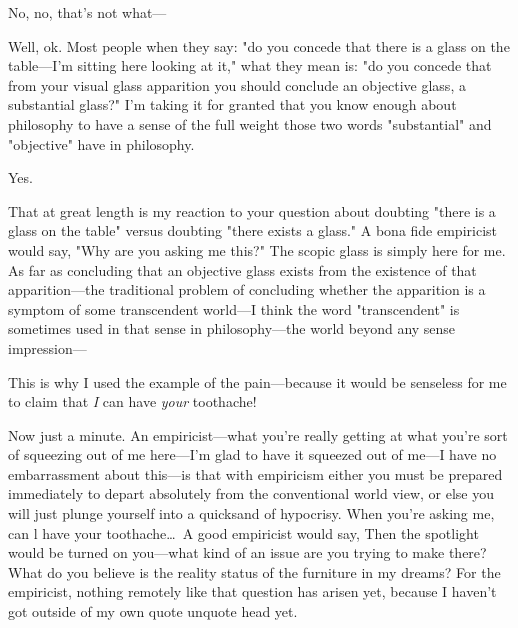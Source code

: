 No, no, that's not what---

 Well, ok. Most people when they say: 
"do you concede that there is a glass on the table---I'm sitting here looking at it," what they 
mean is: "do you concede that from your visual glass apparition you should conclude an objective glass, a substantial glass?" I'm taking it for 
granted that you know enough about philosophy to have a sense of the 
full weight those two words "substantial" and "objective" have in 
philosophy. 

 Yes. 

 That at great length is my reaction to your question about 
doubting "there is a glass on the table" versus doubting "there exists a glass." 
A bona fide empiricist would say, "Why are you asking me this?" 
The scopic glass is simply here for me. As far as concluding that an 
objective glass exists from the existence of that apparition---the traditional 
problem of concluding whether the apparition is a symptom of 
some transcendent world---I think the word "transcendent" is sometimes 
used in that sense in philosophy---the world beyond any sense 
impression--- 

 This is why I used the example of the pain---because it 
would be senseless for me to claim that \emph{I} can have \emph{your} toothache! 

 Now just a minute. An empiricist---what you're really getting 
at what you're sort of squeezing out of me here---I'm glad to have it 
squeezed out of me---I have no embarrassment about this---is that with 
empiricism either you must be prepared immediately to depart 
absolutely from the conventional world view, or else you will just plunge 
yourself into a quicksand of hypocrisy. When you're asking me, can l 
have your toothache\ldots\  A good empiricist would say, 
 Then the spotlight would be 
turned on you---what kind of an issue are you trying to make there? 
What do you believe is the reality status of the furniture in my dreams? 
For the empiricist, nothing remotely like that question has arisen yet, 
because I haven't got outside of my own quote unquote head yet. 

